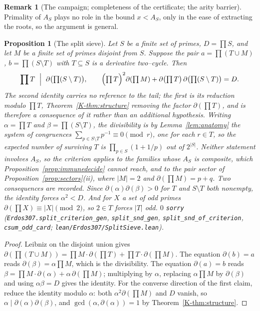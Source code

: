 \documentclass[11pt]{article}
\newtheorem{proposition}[theorem]{Proposition}
\theoremstyle{definition}
\newtheorem{remark}[theorem]{Remark}
\begin{document}
\begin{remark}[The campaign; completeness of the certificate; the arity barrier]
Primality of $A_S$ plays no role in the bound $x<A_S$, only in the ease of extracting the roots, so
the argument is general.

\begin{proposition}[The split sieve]\label{prop:splitsieve}
Let $S$ be a finite set of primes, $D=\prod S$, and let $M$ be a finite set of primes disjoint from
$S$. Suppose the pair $a=\prod(T\cup M)$, $b=\prod(S\setminus T)$ with $T\subseteq S$ is a
derivative two--cycle. Then
\[ \prod T\ \Bigm|\ \partial\bigl(\textstyle\prod(S\setminus T)\bigr),
   \qquad
   \Bigl(\textstyle\prod T\Bigr)^{2}\partial(\textstyle\prod M)
   +\partial\bigl(\textstyle\prod T\bigr)\,\partial\bigl(\textstyle\prod(S\setminus T)\bigr)=D . \]
The second identity carries no reference to the tail; the first is its reduction modulo $\prod T$,
Theorem~\ref{K-thm:structure} removing the factor $\partial(\prod T)$, and is therefore a consequence
of it rather than an additional hypothesis. Writing $\alpha=\prod T$ and $\beta=\prod(S\setminus T)$,
the divisibility is by Lemma~\ref{lem:anatomy} the system of congruences
$\sum_{p\in S\setminus T}p^{-1}\equiv0\pmod r$, one for each $r\in T$, so the expected number of
surviving $T$ is $\prod_{p\in S}(1+1/p)$ out of $2^{|S|}$. Neither statement involves $A_S$, so the
criterion applies to the families whose $A_S$ is composite, which
Proposition~\ref{prop:immunedecide} cannot reach, and to the pair sector of
Proposition~\ref{prop:sectors}(ii), where $|M|=2$ and $\partial(\prod M)=p+q$. Two consequences are
recorded. Since $\partial(\alpha)\partial(\beta)>0$ for $T$ and $S\setminus T$ both nonempty, the
identity forces $\alpha^{2}<D$. And for $X$ a set of odd primes $\partial(\prod X)\equiv|X|\pmod2$,
so $2\in T$ forces $|T|$ odd. $0$ \texttt{sorry}
\textup{(\texttt{Erdos307.split\_criterion\_gen}, \texttt{split\_snd\_gen},
\texttt{split\_snd\_of\_criterion}, \texttt{csum\_odd\_card};
\texttt{lean/Erdos307/SplitSieve.lean})}.
\end{proposition}
\begin{proof}
Leibniz on the disjoint union gives $\partial(\prod(T\cup M))=\prod M\cdot\partial(\prod T)
+\prod T\cdot\partial(\prod M)$. The equation $\partial(b)=a$ reads
$\partial(\beta)=\alpha\prod M$, which is the divisibility. The equation $\partial(a)=b$ reads
$\beta=\prod M\cdot\partial(\alpha)+\alpha\,\partial(\prod M)$; multiplying by $\alpha$, replacing
$\alpha\prod M$ by $\partial(\beta)$ and using $\alpha\beta=D$ gives the identity. For the converse
direction of the first claim, reduce the identity modulo $\alpha$: both $\alpha^{2}\partial(\prod M)$
and $D$ vanish, so $\alpha\mid\partial(\alpha)\partial(\beta)$, and
$\gcd(\alpha,\partial(\alpha))=1$ by Theorem~\ref{K-thm:structure}.
\end{proof}


\end{remark}
\end{document}
